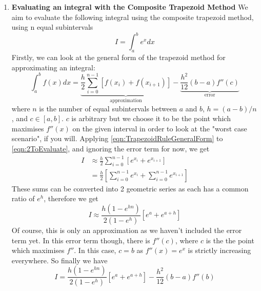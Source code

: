 \documentclass[12pt]{article}
\begin{document}
\begin{enumerate}
        \item \textbf{Evaluating an integral with the Composite Trapezoid Method} \newline
        We aim to evaluate the following integral using the composite trapezoid method, using n 
        equal subintervals
        \begin{equation}
            I = \int_a^b e^xdx
            \label{eqn:2ToEvaluate}
        \end{equation}
        Firstly, we can look at the general form of the trapezoid method for approximating an 
        integral:
        \begin{equation}
            \int_a^b f(x)dx = \underbrace{\frac{h}{2}\sum_{i=0}^{n-1}[f(x_i)+f(x_{i+1})]}_\text{approximation}
            -\underbrace{\frac{h^2}{12}(b-a)f''(c)}_\text{error}
            \label{eqn:TrapezoidRuleGeneralForm}
        \end{equation}
        where $n$ is the number of equal subintervals between $a$ and $b$, $h=(a-b)/n$, and $c\in[a,b]$.
        $c$ is arbitrary but we choose it to be the point which maximises $f''(x)$ on the given 
        interval in order to look at the "worst case scenario", if you will. Applying \autoref{eqn:TrapezoidRuleGeneralForm} 
        to \autoref{eqn:2ToEvaluate}, and ignoring the error term for now, we get 
        \begin{align*}
            I &\approx \frac{h}{2}\sum_{i=0}^{n-1}[e^{x_i}+e^{x_{i+1}}] \\
            &= \frac{h}{2}\left[\sum_{i=0}^{n-1}e^{x_i}+\sum_{i=0}^{n-1}e^{x_{i+1}}\right]
        \end{align*}
        These sums can be converted into 2 geometric series as each has a common ratio of $e^h$, therefore 
        we get
        \begin{equation}
            I \approx \frac{h(1-e^{hn})}{2(1-e^h)}[e^a+e^{a+h}]
            \label{eqn:2SolvedNoError}
        \end{equation}
        Of course, this is only an approximation as we haven't included the error term yet. In this 
        error term though, there is $f''(c)$, where $c$ is the the point which maximises $f''$. In this 
        case, $c=b$ as $f''(x)=e^x$ is strictly increasing everywhere. So finally we have 
        \begin{equation}
            I = \frac{h(1-e^{hn})}{2(1-e^h)}[e^a+e^{a+h}]-\frac{h^2}{12}(b-a)f''(b)
            \label{eqn:2Solved}
        \end{equation}


\end{enumerate}
\end{document}
